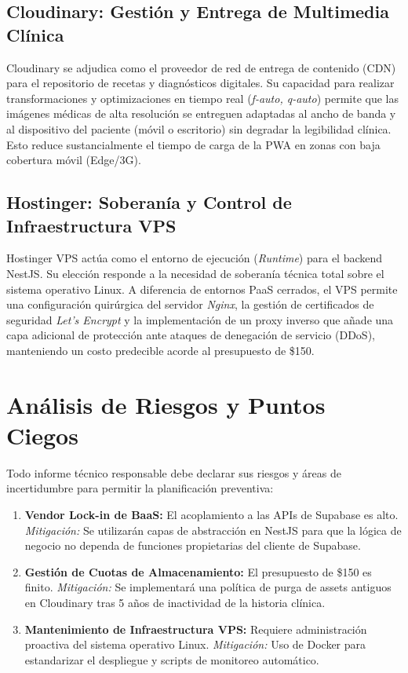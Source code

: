 \documentclass[a4paper,12pt]{article}
\begin{document}
\subsection{Cloudinary: Gestión y Entrega de Multimedia Clínica}
Cloudinary se adjudica como el proveedor de red de entrega de contenido (CDN) para el repositorio de recetas y diagnósticos digitales. Su capacidad para realizar transformaciones y optimizaciones en tiempo real (\textit{f-auto, q-auto}) permite que las imágenes médicas de alta resolución se entreguen adaptadas al ancho de banda y al dispositivo del paciente (móvil o escritorio) sin degradar la legibilidad clínica. Esto reduce sustancialmente el tiempo de carga de la PWA en zonas con baja cobertura móvil (Edge/3G).

\subsection{Hostinger: Soberanía y Control de Infraestructura VPS}
Hostinger VPS actúa como el entorno de ejecución (\textit{Runtime}) para el backend NestJS. Su elección responde a la necesidad de soberanía técnica total sobre el sistema operativo Linux. A diferencia de entornos PaaS cerrados, el VPS permite una configuración quirúrgica del servidor \textit{Nginx}, la gestión de certificados de seguridad \textit{Let's Encrypt} y la implementación de un proxy inverso que añade una capa adicional de protección ante ataques de denegación de servicio (DDoS), manteniendo un costo predecible acorde al presupuesto de \$150.

\section{Análisis de Riesgos y Puntos Ciegos}
Todo informe técnico responsable debe declarar sus riesgos y áreas de incertidumbre para permitir la planificación preventiva:

\begin{enumerate}
    \item \textbf{Vendor Lock-in de BaaS:} El acoplamiento a las APIs de Supabase es alto. \textit{Mitigación:} Se utilizarán capas de abstracción en NestJS para que la lógica de negocio no dependa de funciones propietarias del cliente de Supabase.
    \item \textbf{Gestión de Cuotas de Almacenamiento:} El presupuesto de \$150 es finito. \textit{Mitigación:} Se implementará una política de purga de assets antiguos en Cloudinary tras 5 años de inactividad de la historia clínica.
    \item \textbf{Mantenimiento de Infraestructura VPS:} Requiere administración proactiva del sistema operativo Linux. \textit{Mitigación:} Uso de Docker para estandarizar el despliegue y scripts de monitoreo automático.
\end{enumerate}
\end{document}
